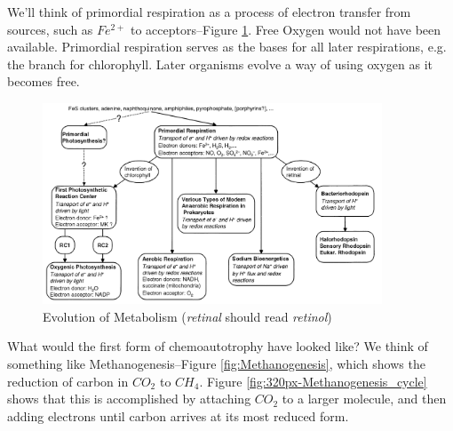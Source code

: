 \documentclass[]{article}
\begin{document}
We'll think of primordial respiration as a process of electron transfer from sources, such as $Fe^{2+}$ to acceptors--Figure \ref{fig:EvolutionMetabolism}. Free Oxygen would not have been available. Primordial respiration serves as the bases for all later respirations, e.g. the branch for chlorophyll. Later organisms evolve a way of using oxygen as it becomes free.
\begin{figure}[H]
	\begin{center}
		\caption[Evolution of Metabolism]{Evolution of Metabolism (\textit{retinal} should read \textit{retinol})} \label{fig:EvolutionMetabolism} 
		\includegraphics[width=0.9\textwidth]{EvolutionMetabolism}
	\end{center}
\end{figure}

What would the first form of chemoautotrophy have looked like? We think of something like Methanogenesis--Figure \ref{fig:Methanogenesis}, which shows the reduction of carbon in $CO_2$ to $CH_4$. Figure \ref{fig:320px-Methanogenesis_cycle} \cite{wiki:methanogenesis} shows that this is accomplished by attaching $CO_2$ to a larger molecule, and then adding electrons until carbon arrives at its most reduced form. 
\end{document}
